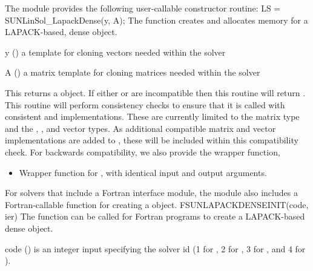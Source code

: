 The module {\sunlinsollapdense} provides the following user-callable constructor routine: 
{
  LS = SUNLinSol\_LapackDense(y, A);
}
{
  The function  creates and allocates
  memory for a LAPACK-based, dense  object.
}
{
  \begin{args}[y]
  \item[y] ()
    a template for cloning vectors needed within the solver
  \item[A] ()
    a {\sunmatdense} matrix template for cloning matrices needed
    within the solver 
  \end{args}
}
{
  This returns a  object.  If either  or
   are incompatible then this routine will return .
}
{
  This routine will perform consistency checks to ensure that it is
  called with consistent {\nvector} and {\sunmatrix} implementations.
  These are currently limited to the {\sunmatdense} matrix type and
  the {\nvecs}, {\nvecopenmp}, and {\nvecpthreads} vector types.  As
  additional compatible matrix and vector implementations are added to
  {\sundials}, these will be included within this compatibility check.
}
For backwards compatibility, we also provide the wrapper function,
\begin{itemize}

\item {}

  Wrapper function for , with identical input and
  output arguments.
  
\end{itemize}
For solvers that include a Fortran interface module, the
{\sunlinsollapdense} module also includes a Fortran-callable function
for creating a  object.
{
  FSUNLAPACKDENSEINIT(code, ier)
}
{
  The function  can be called for Fortran programs
  to create a LAPACK-based dense  object.
}
{
  \begin{args}[code]
  \item[code] ()
    is an integer input specifying the solver id (1 for {\cvode}, 2
    for {\ida}, 3 for {\kinsol}, and 4 for {\arkode}).
  \end{args}
}
